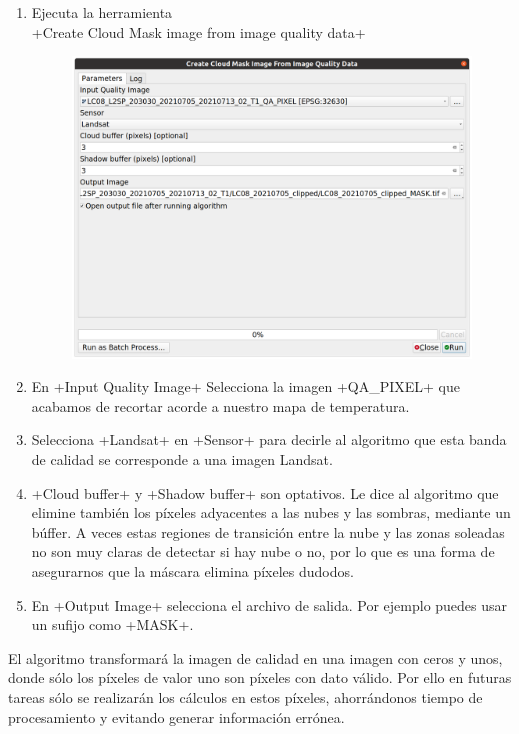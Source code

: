 \documentclass[a4paper,11pt]{article}
\begin{document}
    \begin{enumerate}
     \item Ejecuta la herramienta\\ \cverb+Create Cloud Mask image from image quality data+
     \begin{figure}[H]\centering
      \includegraphics[width=\textwidth]{qgis_cloud_mask}
     \end{figure}
     
     \item En \cverb+Input Quality Image+ Selecciona la imagen \cverb+QA_PIXEL+ que acabamos de recortar acorde a nuestro mapa de temperatura.
     
     \item Selecciona \cverb+Landsat+ en \cverb+Sensor+ para decirle al algoritmo que esta banda de calidad se corresponde a una imagen Landsat.
     
     \item \cverb+Cloud buffer+ y \cverb+Shadow buffer+ son optativos. Le dice al algoritmo que elimine también los píxeles adyacentes a las nubes y las sombras, mediante un búffer. A veces estas regiones de transición entre la nube y las zonas soleadas no son muy claras de detectar si hay nube o no, por lo que es una forma de asegurarnos que la máscara elimina píxeles dudodos.
     
     \item En \cverb+Output Image+ selecciona el archivo de salida. Por ejemplo puedes usar un sufijo como \cverb+MASK+.
    \end{enumerate}
    
    El algoritmo transformará la imagen de calidad en una imagen con ceros y unos, donde sólo los píxeles de valor uno son píxeles con dato válido. Por ello en futuras tareas sólo se realizarán los cálculos en estos píxeles, ahorrándonos tiempo de procesamiento y evitando generar información errónea.
    
\end{document}
